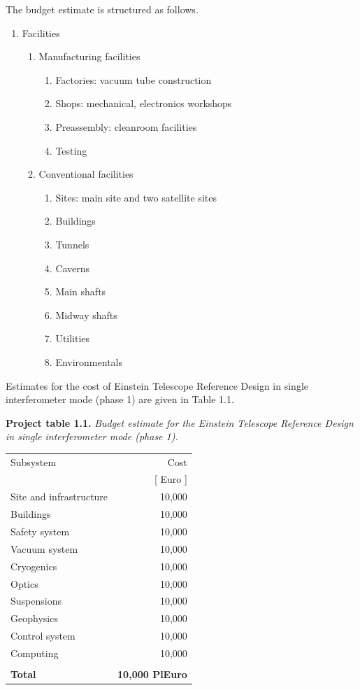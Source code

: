 The budget estimate is structured as follows. 
\begin{enumerate}
\item{} Facilities
\begin{enumerate}
\item{} Manufacturing facilities
\begin{enumerate}
\item{} Factories: vacuum tube construction
\item{} Shops: mechanical, electronics workshops
\item{} Preassembly: cleanroom facilities
\item{} Testing
\end{enumerate}
\item{} Conventional facilities
\begin{enumerate}
\item{} Sites: main site and two satellite sites
\item{} Buildings
\item{} Tunnels
\item{} Caverns
\item{} Main shafts
\item{} Midway shafts
\item{} Utilities
\item{} Environmentals
\end{enumerate}
\end{enumerate}
\end{enumerate}

Estimates for the cost of Einstein Telescope Reference
Design in single interferometer mode (phase 1) are given in Table 1.1.



\medskip
\noindent
{\bf Project table 1.1.} {\sl Budget estimate for the Einstein Telescope Reference
Design in single interferometer mode (phase 1).}

\medskip
\begin{center}
\begin{tabular}{|l||r|}\hline
Subsystem & Cost \\
 & [ Euro ] \\ \hline
Site and infrastructure & 10,000 \\
Buildings &  10,000 \\
Safety system & 10,000 \\
Vacuum system & 10,000 \\
Cryogenics & 10,000 \\
Optics & 10,000 \\
Suspensions & 10,000 \\
Geophysics & 10,000 \\
Control system & 10,000 \\
Computing & 10,000 \\
& \\
{\bf Total} & {\bf 10,000 PlEuro}\\ \hline
\hline
\end{tabular}
\end{center}

